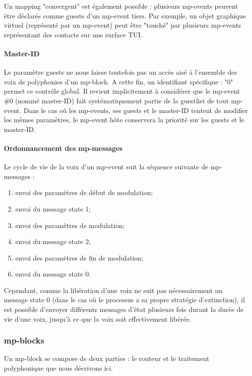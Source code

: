 Un mapping "convergent" est également possible : plusieurs mp-events peuvent être déclarés comme guests d'un mp-event tiers. Par exemple, un objet graphique virtuel (représenté par un mp-event) peut être "touché" par plusieurs mp-events représentant des contacts sur une surface TUI.

\paragraph{Master-ID}
Le paramètre guests ne nous laisse toutefois pas un accès aisé à l'ensemble des voix de polyphonies d'un mp-block. A cette fin, un identifiant spécifique : "0" permet ce contrôle global. Il revient implicitement à considérer que le mp-event \#0 (nommé master-ID) fait systématiquement partie de la guestlist de tout mp-event. Dans le cas où les mp-events, ses guests et le master-ID tentent de modifier les mêmes paramètres, le mp-event hôte conservera la priorité sur les guests et le master-ID.

\paragraph{Ordonnancement des mp-messages}
Le cycle de vie de la voix d'un mp-event suit la séquence suivante de mp-messages :
\vspace{-1em}
\begin{enumerate}[noitemsep]
	\item envoi des paramètres de début de modulation;
	\item envoi du message state 1;
	\item envoi des paramètres de modulation;
	\item envoi du message state 2;
	\item envoi des paramètres de fin de modulation;
	\item envoi du message state 0.
\end{enumerate}
Cependant, comme la libération d'une voix ne suit pas nécessairement un message state 0 (dans le cas où le processus a sa propre stratégie d'extinction), il est possible d'envoyer différents messages d'état plusieurs fois durant la durée de vie d'une voix, jusqu'à ce que la voix soit effectivement libérée.

\subsubsection{mp-blocks}
Un mp-block se compose de deux parties : le routeur et le traitement polyphonique que nous décrivons ici.
